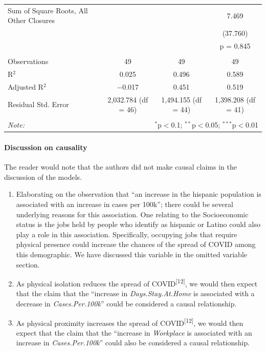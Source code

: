 \documentclass[
]{article}
\providecommand{\tightlist}{%
  \setlength{\itemsep}{0pt}\setlength{\parskip}{0pt}}
\begin{document}
\begin{tabular}{@{\extracolsep{1pt}}lccc}
  Sum of Square Roots, All Other Closures &  &  & 7.469 \\ 
  &  &  & (37.760) \\ 
  &  &  & p = 0.845 \\ 
 \hline \\[-1.8ex] 
Observations & 49 & 49 & 49 \\ 
R$^{2}$ & 0.025 & 0.496 & 0.589 \\ 
Adjusted R$^{2}$ & $-$0.017 & 0.451 & 0.519 \\ 
Residual Std. Error & 2,032.784 (df = 46) & 1,494.155 (df = 44) & 1,398.208 (df = 41) \\ 
\hline 
\hline \\[-1.8ex] 
\textit{Note:}  & \multicolumn{3}{r}{$^{*}$p$<$0.1; $^{**}$p$<$0.05; $^{***}$p$<$0.01} \\ 
\end{tabular} 
\endgroup

\hypertarget{discussion-on-causality}{%
\paragraph{Discussion on causality}\label{discussion-on-causality}}

The reader would note that the authors did not make causal claims in the
discussion of the models.

\begin{enumerate}
\def\labelenumi{\arabic{enumi}.}
\tightlist
\item
  Elaborating on the observation that ``an increase in the hispanic
  population is associated with an increase in cases per 100k''; there
  could be several underlying reasons for this association. One relating
  to the Socioeconomic status is the jobs held by people who identify as
  hispanic or Latino could also play a role in this association.
  Specifically, occupying jobs that require physical presence could
  increase the chances of the spread of COVID among this demographic. We
  have discussed this variable in the omitted variable section.
\item
  As physical isolation reduces the spread of
  COVID\textsuperscript{{[}12{]}}, we would then expect that the claim
  that the ``increase in \emph{Days.Stay.At.Home} is associated with a
  decrease in \emph{Cases.Per.100k}'' could be considered a causal
  relationship.
\item
  As physical proximity increases the spread of
  COVID\textsuperscript{{[}12{]}}, we would then expect that the claim
  that the ``increase in \emph{Workplace} is associated with an increase
  in \emph{Cases.Per.100k}'' could also be considered a causal
  relationship.
\end{enumerate}
\end{document}
